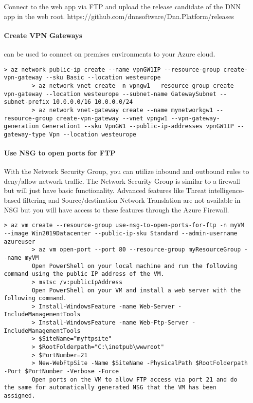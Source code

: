 \documentclass[a4paper,14pt]{report}
\begin{document}
    Connect to the web app via FTP and upload the release candidate of the DNN app in the web root.
    https://github.com/dnnsoftware/Dnn.Platform/releases

    \paragraph{Create VPN Gateways} can be used to connect on premises environments to your Azure cloud.

    \begin{lstlisting}[caption={Create VPN Gateway}]
        > az network public-ip create --name vpnGW1IP --resource-group create-vpn-gateway --sku Basic --location westeurope
        > az network vnet create -n vpngw1 --resource-group create-vpn-gateway --location westeurope --subnet-name GatewaySubnet --subnet-prefix 10.0.0.0/16 10.0.0.0/24
        > az network vnet-gateway create --name mynetworkgw1 --resource-group create-vpn-gateway --vnet vpngw1 --vpn-gateway-generation Generation1 --sku VpnGW1 --public-ip-addresses vpnGW1IP --gateway-type Vpn --location westeurope
    \end{lstlisting}

    \paragraph{Use NSG to open ports for FTP} With the Network Security Group, you can utilize inbound and outbound rules to deny/allow network traffic. The Network Security Group is similar to a firewall but will just have basic functionality. Advanced features like Threat intelligence-based filtering and Source/destination Network Translation are not available in NSG but you will have access to these features through the Azure Firewall.

    \begin{lstlisting}[caption={Use NSG to open ports for FTP}]
        > az vm create --resource-group use-nsg-to-open-ports-for-ftp -n myVM --image Win2019Datacenter --public-ip-sku Standard --admin-username azureuser
        > az vm open-port --port 80 --resource-group myResourceGroup --name myVM
        Open PowerShell on your local machine and run the following command using the public IP address of the VM.
        > mstsc /v:publicIpAddress
        Open PowerShell on your VM and install a web server with the following command.
        > Install-WindowsFeature -name Web-Server -IncludeManagementTools
        > Install-WindowsFeature -name Web-Ftp-Server -IncludeManagementTools
        > $SiteName="myftpsite"
        > $RootFolderpath="C:\inetpub\wwwroot"
        > $PortNumber=21
        > New-WebFtpSite -Name $SiteName -PhysicalPath $RootFolderpath -Port $PortNumber -Verbose -Force
        Open ports on the VM to allow FTP access via port 21 and do the same for automatically generated NSG that the VM has been assigned.
    \end{lstlisting}
\end{document}
